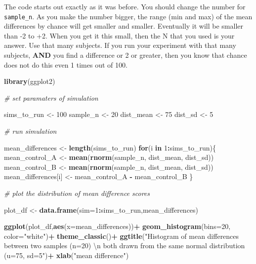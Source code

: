 \documentclass[]{book}
\newenvironment{Shaded}{\begin{snugshade}}{\end{snugshade}}
\newcommand{\KeywordTok}[1]{\textcolor[rgb]{0.13,0.29,0.53}{\textbf{#1}}}
\newcommand{\DataTypeTok}[1]{\textcolor[rgb]{0.13,0.29,0.53}{#1}}
\newcommand{\DecValTok}[1]{\textcolor[rgb]{0.00,0.00,0.81}{#1}}
\newcommand{\CharTok}[1]{\textcolor[rgb]{0.31,0.60,0.02}{#1}}
\newcommand{\StringTok}[1]{\textcolor[rgb]{0.31,0.60,0.02}{#1}}
\newcommand{\CommentTok}[1]{\textcolor[rgb]{0.56,0.35,0.01}{\textit{#1}}}
\newcommand{\ControlFlowTok}[1]{\textcolor[rgb]{0.13,0.29,0.53}{\textbf{#1}}}
\newcommand{\OperatorTok}[1]{\textcolor[rgb]{0.81,0.36,0.00}{\textbf{#1}}}
\newcommand{\NormalTok}[1]{#1}
\begin{document}
The code starts out exactly as it was before. You should change the
number for \texttt{sample\_n}. As you make the number bigger, the range
(min and max) of the mean differences by chance will get smaller and
smaller. Eventually it will be smaller than -2 to +2. When you get it
this small, then the N that you used is your answer. Use that many
subjects. If you run your experiment with that many subjects,
\textbf{AND} you find a difference or 2 or greater, then you know that
chance does not do this even 1 times out of 100.

\begin{Shaded}
\begin{Highlighting}[]
\KeywordTok{library}\NormalTok{(ggplot2)}

\CommentTok{# set paramaters of simulation}

\NormalTok{sims_to_run <-}\StringTok{ }\DecValTok{100}
\NormalTok{sample_n   <-}\StringTok{ }\DecValTok{20}
\NormalTok{dist_mean  <-}\StringTok{ }\DecValTok{75}
\NormalTok{dist_sd    <-}\StringTok{ }\DecValTok{5}

\CommentTok{# run simulation}

\NormalTok{mean_differences <-}\StringTok{ }\KeywordTok{length}\NormalTok{(sims_to_run)}
\ControlFlowTok{for}\NormalTok{(i }\ControlFlowTok{in} \DecValTok{1}\OperatorTok{:}\NormalTok{sims_to_run)\{}
\NormalTok{  mean_control_A      <-}\StringTok{ }\KeywordTok{mean}\NormalTok{(}\KeywordTok{rnorm}\NormalTok{(sample_n, dist_mean, dist_sd))}
\NormalTok{  mean_control_B      <-}\StringTok{ }\KeywordTok{mean}\NormalTok{(}\KeywordTok{rnorm}\NormalTok{(sample_n, dist_mean, dist_sd))}
\NormalTok{  mean_differences[i] <-}\StringTok{ }\NormalTok{mean_control_A }\OperatorTok{-}\StringTok{ }\NormalTok{mean_control_B}
\NormalTok{\}}

\CommentTok{# plot the  distribution of mean difference scores}

\NormalTok{plot_df <-}\StringTok{ }\KeywordTok{data.frame}\NormalTok{(}\DataTypeTok{sim=}\DecValTok{1}\OperatorTok{:}\NormalTok{sims_to_run,mean_differences)}

\KeywordTok{ggplot}\NormalTok{(plot_df,}\KeywordTok{aes}\NormalTok{(}\DataTypeTok{x=}\NormalTok{mean_differences))}\OperatorTok{+}
\StringTok{  }\KeywordTok{geom_histogram}\NormalTok{(}\DataTypeTok{bins=}\DecValTok{20}\NormalTok{, }\DataTypeTok{color=}\StringTok{"white"}\NormalTok{)}\OperatorTok{+}
\StringTok{  }\KeywordTok{theme_classic}\NormalTok{()}\OperatorTok{+}
\StringTok{  }\KeywordTok{ggtitle}\NormalTok{(}\StringTok{"Histogram of mean differences between two samples (n=20) }\CharTok{\textbackslash{}n}
\StringTok{          both drawn from the same normal distribution (u=75, sd=5"}\NormalTok{)}\OperatorTok{+}
\StringTok{  }\KeywordTok{xlab}\NormalTok{(}\StringTok{"mean difference"}\NormalTok{)}
\end{Highlighting}
\end{Shaded}
\end{document}
